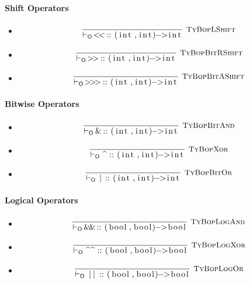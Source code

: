 \documentclass{article}
\newcommand{\code}[1]{\lstinline[columns=fixed]{#1}}
\newcommand{\drmrule}[5]{\frac{#1}{#2\vdash_{\mathsf{#3}}#4}\textsc{\ \small{#5}}}
\newcommand{\mc}[1]{\textnormal{\code{#1}}}
\newcommand{\subsubsubsection}{\paragraph}
\begin{document}
				\subsubsubsection{Shift Operators}
				
					\begin{itemize}
						\item
							\begin{align*}
								\drmrule{}{}{O}{\mc{<<} :: \mc{(int,int)->int}}{TyBopLShift}
							\end{align*}
						\item
							\begin{align*}
								\drmrule{}{}{O}{\mc{>>} :: \mc{(int,int)->int}}{TyBopBitRShift}
							\end{align*}
						\item
							\begin{align*}
								\drmrule{}{}{O}{\mc{>>>} :: \mc{(int,int)->int}}{TyBopBitAShift}
							\end{align*}
					\end{itemize}
				
				\subsubsubsection{Bitwise Operators}
				
					\begin{itemize}
						\item
							\begin{align*}
								\drmrule{}{}{O}{\mc{\&} :: \mc{(int,int)->int}}{TyBopBitAnd}
							\end{align*}
						\item
							\begin{align*}
								\drmrule{}{}{O}{\mc{^} :: \mc{(int,int)->int}}{TyBopXor}
							\end{align*}
						\item
							\begin{align*}
								\drmrule{}{}{O}{\mc{|} :: \mc{(int,int)->int}}{TyBopBitOr}
							\end{align*}
					\end{itemize}
				
				\subsubsubsection{Logical Operators}
				
					\begin{itemize}
						\item 
							\begin{align*}
								\drmrule{}{}{O}{\mc{\&\&} :: \mc{(bool,bool)->bool}}{TyBopLogAnd}
							\end{align*}
						\item 
							\begin{align*}
								\drmrule{}{}{O}{\mc{\^\^} :: \mc{(bool,bool)->bool}}{TyBopLogXor}
							\end{align*}
						\item 
							\begin{align*}
								\drmrule{}{}{O}{\mc{||} :: \mc{(bool,bool)->bool}}{TyBopLogOr}
							\end{align*}
					\end{itemize}
				
\end{document}
